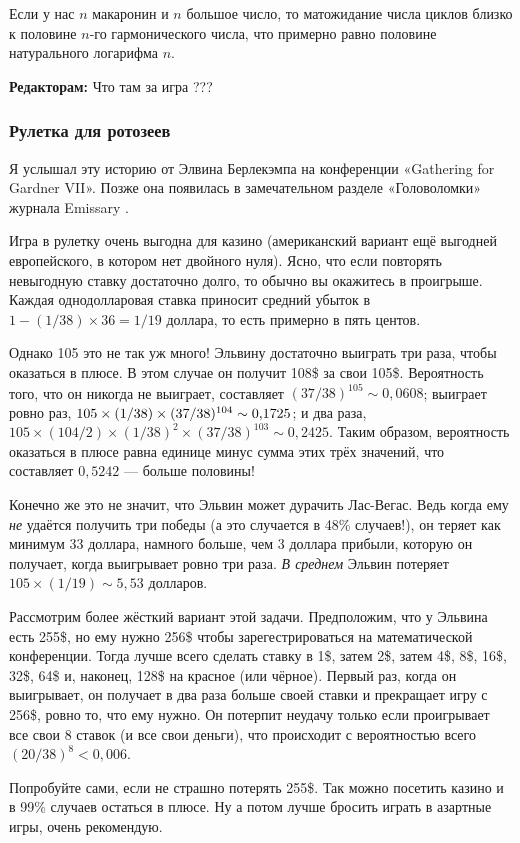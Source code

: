 Если у нас $n$ макаронин и $n$ большое число, то матожидание числа циклов близко к половине $n$-го гармонического числа, что примерно равно половине натурального логарифма $n$.

\begin{addedbytheeditors}
\textbf{Редакторам:} Что там за игра ???
\end{addedbytheeditors}


\subsubsection*{Рулетка для ротозеев}

Я услышал эту историю от Элвина Берлекэмпа на конференции
«Gathering for Gardner VII».
Позже она появилась в замечательном разделе «Головоломки» журнала Emissary \cite[весна/осень 2006 года]{3}.

Игра в рулетку очень выгодна для казино (американский вариант ещё выгодней европейского, в котором нет двойного нуля).
Ясно, что если повторять невыгодную ставку достаточно долго, то обычно вы окажитесь в проигрыше.
Каждая однодолларовая ставка приносит средний убыток в  $1 - (1/38) \times 36 = 1/19$ доллара, то есть примерно в пять центов.

Однако 105 это не так уж много!
Эльвину достаточно выиграть три раза, чтобы оказаться в плюсе.
В этом случае он получит 108\$ за свои 105\$.
Вероятность того, что он никогда не выиграет, составляет $(37/38)^{105} \sim 0{,}0608$;
выиграет ровно раз, $105 \times (1/38) \times (37/38)^{104} \z\sim 0{,}1725$;
и два раза, $105 \times (104/2) \times (1/38)^2 \times (37/38)^{103} \sim 0{,}2425$.
Таким образом, вероятность оказаться в плюсе равна единице минус сумма этих трёх значений, что составляет $0{,}5242$ --- больше половины!

Конечно же это не значит, что Эльвин может дурачить Лас-Вегас.
Ведь когда ему \emph{не} удаётся получить три победы (а это случается в 48\% случаев!), он теряет как минимум 33 доллара, намного больше, чем 3 доллара прибыли, которую он получает, когда выигрывает ровно три раза.
\emph{В среднем} Эльвин потеряет $105 \times (1/19) \sim 5{,}53$ долларов.

Рассмотрим более жёсткий вариант этой задачи.
Предположим, что у Эльвина есть 255\$, но ему нужно 256\$ чтобы зарегестрироваться на математической конференции.
Тогда лучше всего сделать ставку в 1\$, затем 2\$, затем 4\$, 8\$, 16\$, 32\$, 64\$ и, наконец, 128\$ на красное (или чёрное).
Первый раз, когда он выигрывает, он получает в два раза больше своей ставки и прекращает игру с 256\$, ровно то, что ему нужно.
Он потерпит неудачу только если проигрывает все свои $8$ ставок (и все свои деньги), что происходит с вероятностью всего $(20/38)^8 < 0{,}006$.

Попробуйте сами, если не страшно потерять 255\$.
Так можно посетить казино и в 99\% случаев остаться в плюсе.
Ну а потом лучше бросить играть в азартные игры, очень рекомендую.
